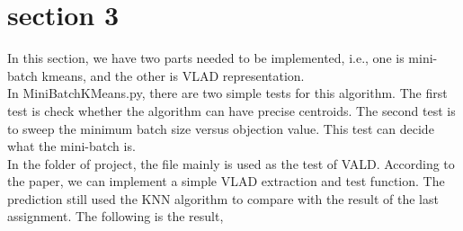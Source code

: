 \documentclass [12pt] {article}
\begin{document}
\section{section 3}
In this section, we have two parts needed to be implemented, i.e., one is mini-batch kmeans, and the other is VLAD representation. \\
In MiniBatchKMeans.py, there are two simple tests for this algorithm. The first test is check whether the algorithm can have precise centroids. 
The second test is to sweep the minimum batch size versus objection value. This test can decide what the mini-batch is.  \\
In the folder of project, the file mainly is used as the test of VALD. According to the paper, we can implement a simple VLAD extraction and test
function. The prediction still used the KNN algorithm to compare with the result of the last assignment. The following is the result, \\

\end{document}
